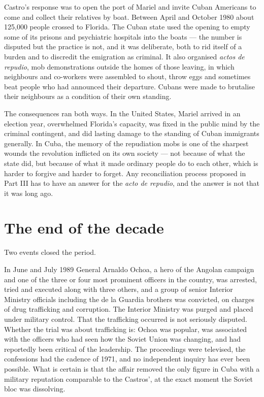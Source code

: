 Castro's response was to open the port of Mariel and invite Cuban Americans to
come and collect their relatives by boat. Between April and October 1980 about
125,000 people crossed to Florida. The Cuban state used the opening to empty
some of its prisons and psychiatric hospitals into the boats --- the number is
disputed but the practice is not, and it was deliberate, both to rid itself of
a burden and to discredit the emigration as criminal. It also organised
\emph{actos de repudio}, mob demonstrations outside the homes of those leaving,
in which neighbours and co-workers were assembled to shout, throw eggs and
sometimes beat people who had announced their departure. Cubans were made to
brutalise their neighbours as a condition of their own standing.

The consequences ran both ways. In the United States, Mariel arrived in an
election year, overwhelmed Florida's capacity, was fixed in the public mind by
the criminal contingent, and did lasting damage to the standing of Cuban
immigrants generally. In Cuba, the memory of the repudiation mobs is one of the
sharpest wounds the revolution inflicted on its own society --- not because of
what the state did, but because of what it made ordinary people do to each
other, which is harder to forgive and harder to forget. Any reconciliation
process proposed in Part III has to have an answer for the \emph{acto de
repudio}, and the answer is not that it was long ago.

\section{The end of the decade}

Two events closed the period.

In June and July 1989 General Arnaldo Ochoa, a hero of the Angolan campaign and
one of the three or four most prominent officers in the country, was arrested,
tried and executed along with three others, and a group of senior Interior
Ministry officials including the de la Guardia brothers was convicted, on
charges of drug trafficking and corruption. The Interior Ministry was purged and
placed under military control. That the trafficking occurred is not seriously
disputed. Whether the trial was about trafficking is: Ochoa was popular, was
associated with the officers who had seen how the Soviet Union was changing, and
had reportedly been critical of the leadership. The proceedings were televised,
the confessions had the cadence of 1971, and no independent inquiry has ever
been possible. What is certain is that the affair removed the only figure in
Cuba with a military reputation comparable to the Castros', at the exact moment
the Soviet bloc was dissolving.

